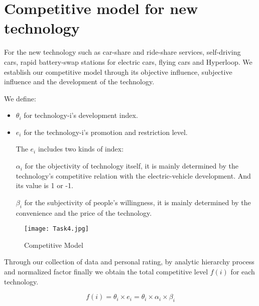 \documentclass[12pt]{article}  %
\begin{document}
\section{Competitive model for new technology}

For the new technology such as car-share and ride-share services, self-driving cars, rapid battery-swap stations for electric cars, flying cars and Hyperloop. We establish our competitive model through its objective influence, subjective influence and the development of the technology.

We define:
\begin{itemize}
	\item ${\theta _i}$ for technology-i's development index.
	\item ${e_i}$ for the technology-i's promotion and restriction level.
	
	The ${e_i}$ includes two kinds of index:
	
	${\alpha _i}$ for the objectivity of technology itself, it is mainly determined by the technology's competitive relation with the electric-vehicle development. And its value is 1 or -1.
	
	${\beta _i}$ for the subjectivity of people's willingness, it is mainly determined by the convenience and the price of the technology.
\end{itemize}

\begin{figure}[H]
	\centering
	\texttt{[image: Task4.jpg]}
	\caption{Competitive Model}\label{fig:15}
\end{figure}

Through our collection of data and personal rating, by analytic hierarchy process and normalized factor finally we obtain the total competitive level $f(i)$ for each technology.

\begin{equation}
f(i) = {\theta _i} \times {e_i} = {\theta _i} \times {\alpha _i} \times {\beta _i}
\end{equation}
\end{document}
